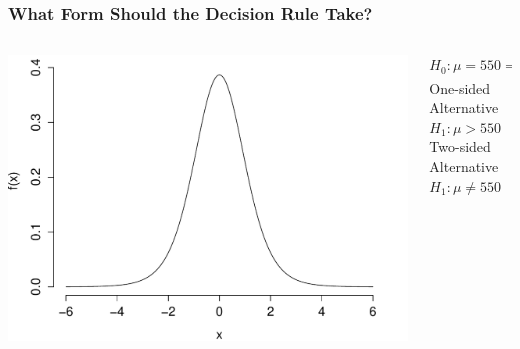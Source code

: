 \begin{frame}
\frametitle{What Form Should the Decision Rule Take?}
\begin{columns}
\begin{column}{6cm}
\includegraphics[scale = 0.5]{./images/t_pdf}
\end{column}

\begin{column}{6cm}
$H_0\colon \mu=550 \Rightarrow \displaystyle \frac{\bar{X} - 550}{S/3} \sim t(8)$\\ \pause
\vspace{1em}
One-sided Alternative $H_1\colon \mu > 550$\\ \pause
\vspace{1em}
Two-sided Alternative $H_1\colon \mu \neq 550$ 
\end{column}

\end{columns}
 
\end{frame}

